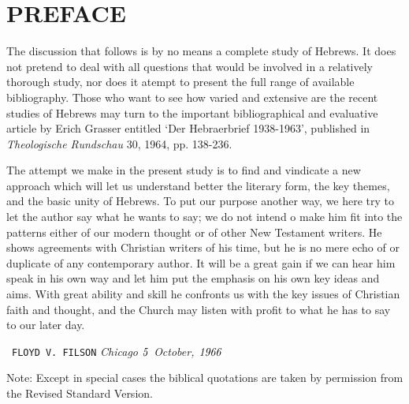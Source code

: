 \chapter*{PREFACE}
The discussion that follows is by no means a complete study of Hebrews.
It does not pretend to deal with all questions that would be involved in a
relatively thorough study, nor does it atempt to present the full range of
available bibliography.
Those who want to see how varied and extensive are the recent studies of
Hebrews may turn to the important bibliographical and evaluative article by
Erich Grasser entitled `Der Hebraerbrief 1938-1963', published in
{\it Theologische Rundschau} 30, 1964, pp. 138-236.

The attempt we make in the present study is to find and vindicate a new
approach which will let us understand better the literary form, the key themes,
and the basic unity of Hebrews.
To put our purpose another way, we here try to let the author say what he wants
to say; we do not intend o make him fit into the patterns either of our modern
thought or of other New Testament writers.
He shows agreements with Christian writers of his time, but he is no mere echo
of or duplicate of any contemporary author.
It will be a great gain if we can hear him speak in his own way and let him put
the emphasis on his own key ideas and aims.
With great ability and skill he confronts us with the key issues of Christian
faith and thought, and the Church may listen with profit to what he has to say
to our later day.
\newline

\hfill~\texttt{FLOYD V. FILSON}
\newline
{\it Chicago}
\newline
{\it $\it 5$ October, $\it 1966$}
\newline

Note: Except in special cases the biblical quotations are taken by permission
from the Revised Standard Version.

